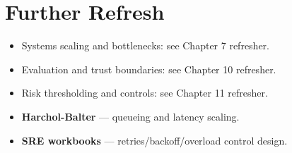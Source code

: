 \section*{Further Refresh}
\begin{itemize}[leftmargin=1.5em]
  \item Systems scaling and bottlenecks: see Chapter 7 refresher.
  \item Evaluation and trust boundaries: see Chapter 10 refresher.
  \item Risk thresholding and controls: see Chapter 11 refresher.
  \item \textbf{Harchol-Balter} --- queueing and latency scaling.
  \item \textbf{SRE workbooks} --- retries/backoff/overload control design.
\end{itemize}
